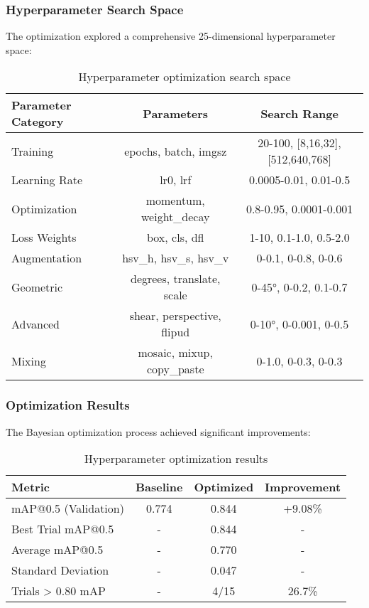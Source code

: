\documentclass[12pt,a4paper]{article}
\begin{document}
\subsubsection{Hyperparameter Search Space}
The optimization explored a comprehensive 25-dimensional hyperparameter space:
\begin{table}[H]
\centering
\begin{tabular}{lcc}
\toprule
\textbf{Parameter Category} & \textbf{Parameters} & \textbf{Search Range} \\
\midrule
Training & epochs, batch, imgsz & 20-100, [8,16,32], [512,640,768] \\
Learning Rate & lr0, lrf & 0.0005-0.01, 0.01-0.5 \\
Optimization & momentum, weight\_decay & 0.8-0.95, 0.0001-0.001 \\
Loss Weights & box, cls, dfl & 1-10, 0.1-1.0, 0.5-2.0 \\
Augmentation & hsv\_h, hsv\_s, hsv\_v & 0-0.1, 0-0.8, 0-0.6 \\
Geometric & degrees, translate, scale & 0-45°, 0-0.2, 0.1-0.7 \\
Advanced & shear, perspective, flipud & 0-10°, 0-0.001, 0-0.5 \\
Mixing & mosaic, mixup, copy\_paste & 0-1.0, 0-0.3, 0-0.3 \\
\bottomrule
\end{tabular}
\caption{Hyperparameter optimization search space}
\label{tab:hyperparameter_search_space}
\end{table}

\subsubsection{Optimization Results}
The Bayesian optimization process achieved significant improvements:
\begin{table}[H]
\centering
\begin{tabular}{lccc}
\toprule
\textbf{Metric} & \textbf{Baseline} & \textbf{Optimized} & \textbf{Improvement} \\
\midrule
mAP@0.5 (Validation) & 0.774 & 0.844 & +9.08\% \\
Best Trial mAP@0.5 & - & 0.844 & - \\
Average mAP@0.5 & - & 0.770 & - \\
Standard Deviation & - & 0.047 & - \\
Trials > 0.80 mAP & - & 4/15 & 26.7\% \\
\bottomrule
\end{tabular}
\caption{Hyperparameter optimization results}
\label{tab:hyperparameter_optimization_results}
\end{table}
\end{document}
